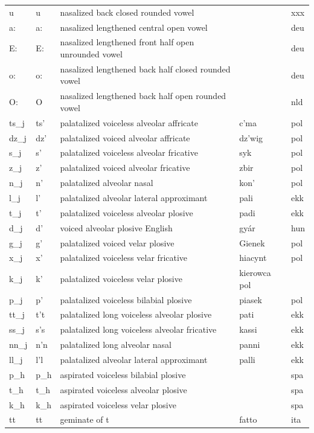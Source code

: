 \documentclass[twoside,a4paper]{book}
\begin{document}
\begin{longtable}{lllll}
	u~ & u~ & nasalized back closed rounded vowel & & xxx\\
	a:~ & a:~ & nasalized lengthened central open vowel & & deu\\
	E:~ & E:~ & nasalized lengthened front half open unrounded vowel & & deu\\
	o:~ & o:~ & nasalized lengthened back half closed rounded vowel & & deu\\
	O:~ & O~ & nasalized lengthened back half open rounded vowel & & nld\\
	ts\_j & ts' & palatalized voiceless alveolar affricate & c'ma & pol\\
	dz\_j & dz' & palatalized voiced alveolar affricate & dz'wig & pol\\
	s\_j & s' & palatalized voiceless alveolar fricative & syk & pol\\
	z\_j & z' & palatalized voiced alveolar fricative & zbir & pol\\
	n\_j & n' & palatalized alveolar nasal & kon' & pol\\
	l\_j & l' & palatalized alveolar lateral approximant & pali & ekk\\
	t\_j & t' & palatalized voiceless alveolar plosive & padi & ekk\\
	d\_j & d' & voiced alveolar plosive English & gyár & hun\\
	g\_j & g' & palatalized voiced velar plosive & Gienek & pol\\
	x\_j & x' & palatalized voiceless velar fricative & hiacynt & pol\\
	k\_j & k' & palatalized voiceless velar plosive & kierowca pol\\
	p\_j & p' & palatalized voiceless bilabial plosive & piasek & pol\\
	tt\_j & t't & palatalized long voiceless alveolar plosive & pati & ekk\\
	ss\_j & s's & palatalized long voiceless alveolar fricative & kassi & ekk\\
	nn\_j & n'n & palatalized long alveolar nasal & panni & ekk\\
	ll\_j & l'l & palatalized alveolar lateral approximant & palli & ekk\\
	p\_h & p\_h & aspirated voiceless bilabial plosive & & spa\\
	t\_h & t\_h & aspirated voiceless alveolar plosive & & spa\\
	k\_h & k\_h & aspirated voiceless velar plosive & & spa\\
	tt & tt & geminate of t & fatto & ita\\

\end{longtable}
\end{document}

